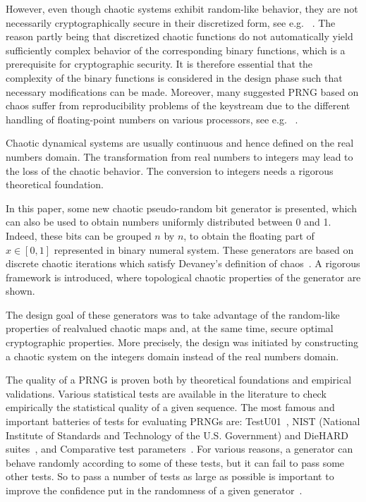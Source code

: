 However, even though chaotic systems exhibit
random-like behavior, they are not necessarily cryptographically secure in their discretized
form, see e.g. ~\cite{HabutsuNSM91,Biham91cryptanalysisof}. The reason partly being that discretized chaotic functions do not automatically
yield sufficiently complex behavior of the corresponding binary functions, which is
a prerequisite for cryptographic security. It is therefore essential that the complexity of the
binary functions is considered in the design phase such that necessary modifications can be
made. Moreover, many suggested PRNG based on chaos suffer from reproducibility problems
of the keystream due to the different handling of floating-point numbers on various processors,
see e.g. ~\cite{Matthews:1984}.

Chaotic dynamical systems are usually continuous and hence defined on the real numbers domain. The transformation from real numbers to integers may lead to the loss of the chaotic behavior. The conversion to integers needs a rigorous theoretical foundation.

In this paper, some new chaotic pseudo-random bit generator is presented, which can also be used to obtain numbers uniformly distributed between 0 and 1. Indeed, these bits can be grouped $n$ by $n$, to obtain the floating part of $x \in [0,1]$ represented in binary numeral system. These generators are based on discrete chaotic iterations which satisfy Devaney's definition of chaos~\cite{guyeux09}. A rigorous  framework is introduced, where topological chaotic properties of the generator are shown. 

The design goal of  these generators was to take advantage of the random-like properties of realvalued
chaotic maps and, at the same time, secure optimal cryptographic properties. More precisely, the design was initiated by constructing a chaotic system
on the integers domain instead of the real numbers domain.

The quality of a PRNG is proven both by theoretical foundations and empirical validations. 
Various statistical tests are available in the literature to check empirically the statistical quality of a given sequence.
The most famous and important batteries of tests for evaluating PRNGs are: TestU01~\cite{Lecuyer2009}, 
NIST (National Institute of Standards and Technology of the U.S. Government) and DieHARD suites~\cite{ANDREW2008,Marsaglia1996}, and Comparative test parameters~\cite{Menezes1997}.
For various reasons, a generator can behave randomly according to some of these tests, but it can fail to pass some other tests. 
So to pass a number of tests as large as possible is important to improve the confidence put in the randomness of a given generator~\cite{Turan2008}. 


